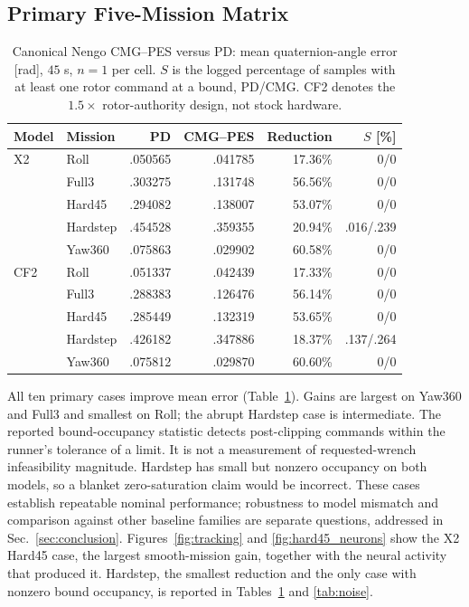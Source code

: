 \documentclass[letterpaper,10pt,conference]{IEEEtran}
\begin{document}
\subsection{Primary Five-Mission Matrix}
\begin{table}[h]
\caption{Canonical Nengo CMG--PES versus PD: mean quaternion-angle error
[rad], $45$ s, $n=1$ per cell. $S$ is the logged percentage of samples with
at least one rotor command at a bound, PD/CMG. CF2 denotes the $1.5\times$
rotor-authority design, not stock hardware.}
\label{tab:mujoco}\centering\scriptsize
\setlength{\tabcolsep}{3pt}
\begin{tabular}{llrrrr}
\toprule
Model&Mission&PD&CMG--PES&Reduction&$S$ [\%]\\\midrule
X2&Roll&.050565&.041785&17.36\%&0/0\\
&Full3&.303275&.131748&56.56\%&0/0\\
&Hard45&.294082&.138007&53.07\%&0/0\\
&Hardstep&.454528&.359355&20.94\%&.016/.239\\
&Yaw360&.075863&.029902&60.58\%&0/0\\\midrule
CF2&Roll&.051337&.042439&17.33\%&0/0\\
&Full3&.288383&.126476&56.14\%&0/0\\
&Hard45&.285449&.132319&53.65\%&0/0\\
&Hardstep&.426182&.347886&18.37\%&.137/.264\\
&Yaw360&.075812&.029870&60.60\%&0/0\\\bottomrule
\end{tabular}
\end{table}
All ten primary cases improve mean error (Table~\ref{tab:mujoco}). Gains
are largest on Yaw360 and Full3 and smallest on Roll; the abrupt Hardstep
case is intermediate. The reported bound-occupancy statistic detects
post-clipping commands within the runner's tolerance of a limit. It is not
a measurement of requested-wrench infeasibility magnitude. Hardstep has
small but nonzero occupancy on both models, so a blanket zero-saturation
claim would be incorrect. These cases establish repeatable nominal performance; robustness to model
mismatch and comparison against other baseline families are separate
questions, addressed in Sec.~\ref{sec:conclusion}. Figures~\ref{fig:tracking} and \ref{fig:hard45_neurons} show
the X2 Hard45 case, the largest smooth-mission gain, together with the
neural activity that produced it. Hardstep, the smallest reduction and the
only case with nonzero bound occupancy, is reported in
Tables~\ref{tab:mujoco} and \ref{tab:noise}.
\end{document}

